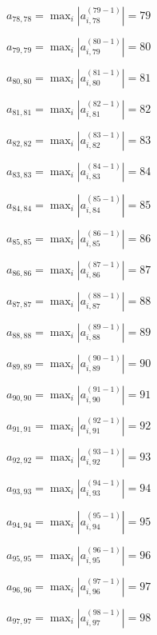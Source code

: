 \documentclass[a4paper,12pt]{article}
\begin{document}
$a _{ 78, 78 } =  \max _i |a _{ i, 78 } ^{ (79 - 1) } | = 79$

$a _{ 79, 79 } =  \max _i |a _{ i, 79 } ^{ (80 - 1) } | = 80$

$a _{ 80, 80 } =  \max _i |a _{ i, 80 } ^{ (81 - 1) } | = 81$

$a _{ 81, 81 } =  \max _i |a _{ i, 81 } ^{ (82 - 1) } | = 82$

$a _{ 82, 82 } =  \max _i |a _{ i, 82 } ^{ (83 - 1) } | = 83$

$a _{ 83, 83 } =  \max _i |a _{ i, 83 } ^{ (84 - 1) } | = 84$

$a _{ 84, 84 } =  \max _i |a _{ i, 84 } ^{ (85 - 1) } | = 85$

$a _{ 85, 85 } =  \max _i |a _{ i, 85 } ^{ (86 - 1) } | = 86$

$a _{ 86, 86 } =  \max _i |a _{ i, 86 } ^{ (87 - 1) } | = 87$

$a _{ 87, 87 } =  \max _i |a _{ i, 87 } ^{ (88 - 1) } | = 88$

$a _{ 88, 88 } =  \max _i |a _{ i, 88 } ^{ (89 - 1) } | = 89$

$a _{ 89, 89 } =  \max _i |a _{ i, 89 } ^{ (90 - 1) } | = 90$

$a _{ 90, 90 } =  \max _i |a _{ i, 90 } ^{ (91 - 1) } | = 91$

$a _{ 91, 91 } =  \max _i |a _{ i, 91 } ^{ (92 - 1) } | = 92$

$a _{ 92, 92 } =  \max _i |a _{ i, 92 } ^{ (93 - 1) } | = 93$

$a _{ 93, 93 } =  \max _i |a _{ i, 93 } ^{ (94 - 1) } | = 94$

$a _{ 94, 94 } =  \max _i |a _{ i, 94 } ^{ (95 - 1) } | = 95$

$a _{ 95, 95 } =  \max _i |a _{ i, 95 } ^{ (96 - 1) } | = 96$

$a _{ 96, 96 } =  \max _i |a _{ i, 96 } ^{ (97 - 1) } | = 97$

$a _{ 97, 97 } =  \max _i |a _{ i, 97 } ^{ (98 - 1) } | = 98$
\end{document}
